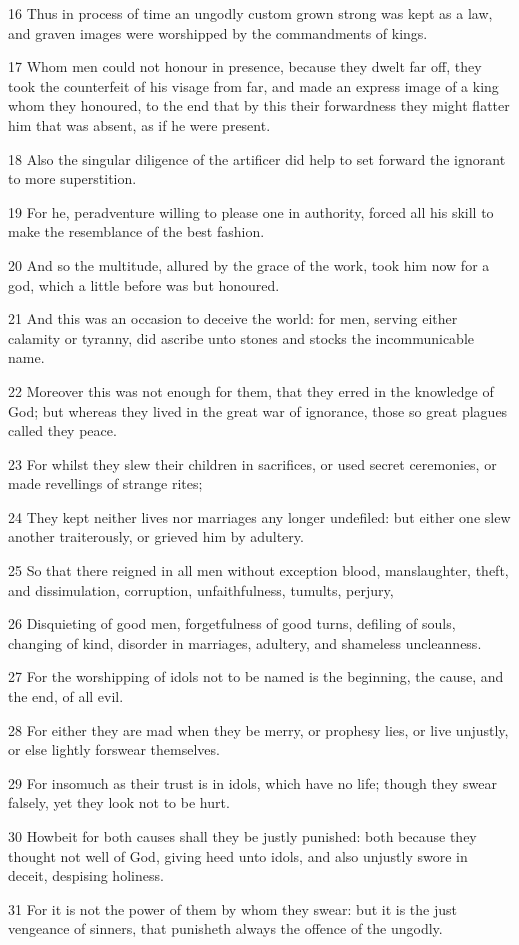\par 16 Thus in process of time an ungodly custom grown strong was kept as a law, and graven images were worshipped by the commandments of kings.
\par 17 Whom men could not honour in presence, because they dwelt far off, they took the counterfeit of his visage from far, and made an express image of a king whom they honoured, to the end that by this their forwardness they might flatter him that was absent, as if he were present.
\par 18 Also the singular diligence of the artificer did help to set forward the ignorant to more superstition.
\par 19 For he, peradventure willing to please one in authority, forced all his skill to make the resemblance of the best fashion.
\par 20 And so the multitude, allured by the grace of the work, took him now for a god, which a little before was but honoured.
\par 21 And this was an occasion to deceive the world: for men, serving either calamity or tyranny, did ascribe unto stones and stocks the incommunicable name.
\par 22 Moreover this was not enough for them, that they erred in the knowledge of God; but whereas they lived in the great war of ignorance, those so great plagues called they peace.
\par 23 For whilst they slew their children in sacrifices, or used secret ceremonies, or made revellings of strange rites;
\par 24 They kept neither lives nor marriages any longer undefiled: but either one slew another traiterously, or grieved him by adultery.
\par 25 So that there reigned in all men without exception blood, manslaughter, theft, and dissimulation, corruption, unfaithfulness, tumults, perjury,
\par 26 Disquieting of good men, forgetfulness of good turns, defiling of souls, changing of kind, disorder in marriages, adultery, and shameless uncleanness.
\par 27 For the worshipping of idols not to be named is the beginning, the cause, and the end, of all evil.
\par 28 For either they are mad when they be merry, or prophesy lies, or live unjustly, or else lightly forswear themselves.
\par 29 For insomuch as their trust is in idols, which have no life; though they swear falsely, yet they look not to be hurt.
\par 30 Howbeit for both causes shall they be justly punished: both because they thought not well of God, giving heed unto idols, and also unjustly swore in deceit, despising holiness.
\par 31 For it is not the power of them by whom they swear: but it is the just vengeance of sinners, that punisheth always the offence of the ungodly.


